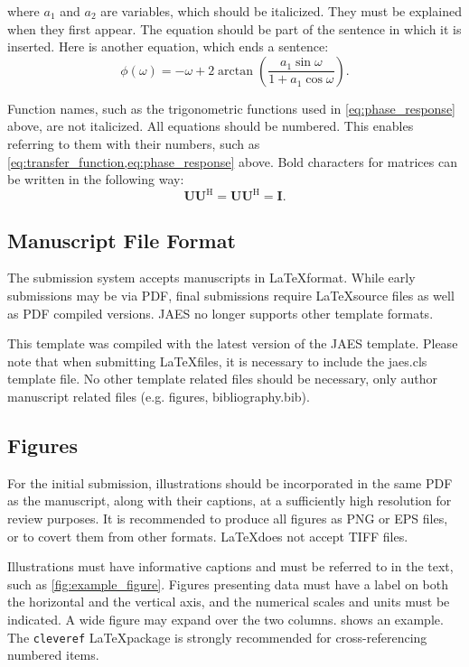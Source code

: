 \documentclass[fleqn,draft]{jaes}
\begin{document}
\noindent where $a_1$ and $a_2$ are variables, which should be italicized. They must be explained when they first appear. The equation should be part of the sentence in which it is inserted. Here is another equation, which ends a sentence: 
\begin{equation}
\phi (\omega ) =  - \omega  + 2 \arctan \left( {\frac{{a_1 \sin \omega }}{{1 + a_1 \cos \omega }}} \right).
\label{eq:phase_response}
\end{equation}
 
\noindent Function names, such as the trigonometric functions used in \cref{eq:phase_response} above, are not italicized. All equations should be numbered. This enables referring to them with their numbers, such as \cref{eq:transfer_function,eq:phase_response} above. Bold characters for matrices can be written in the following way:
\begin{equation}
\mathbf{U}\mathbf{U}^\mathrm{H} = \mathbf{U}\mathbf{U}^\mathrm{H} = \mathbf{I}.
\end{equation}

\subsection{Manuscript File Format}
The submission system accepts manuscripts in \LaTeX format. While early submissions may be via PDF, final submissions require \LaTeX source files as well as PDF compiled versions. JAES no longer supports other template formats. 

This template was compiled with the latest version of the JAES template. Please note that when submitting \LaTeX files, it is necessary to include the jaes.cls template file. No other template related files should be necessary, only author manuscript related files (e.g. figures, bibliography.bib). 

\subsection{Figures}

For the initial submission, illustrations should be incorporated in the same PDF as the manuscript, along with their captions, at a sufficiently high resolution for review purposes. It is recommended to produce all figures as PNG or EPS files, or to covert them from other formats. \LaTeX does not accept TIFF files. 
 
Illustrations must have informative captions and must be referred to in the text, such as \cref{fig:example_figure}. Figures presenting data must have a label on both the horizontal and the vertical axis, and the numerical scales and units must be indicated. A wide figure may expand over the two columns.  shows an example. The \texttt{cleveref} \LaTeX package is strongly recommended for cross-referencing numbered items. 
\end{document}
